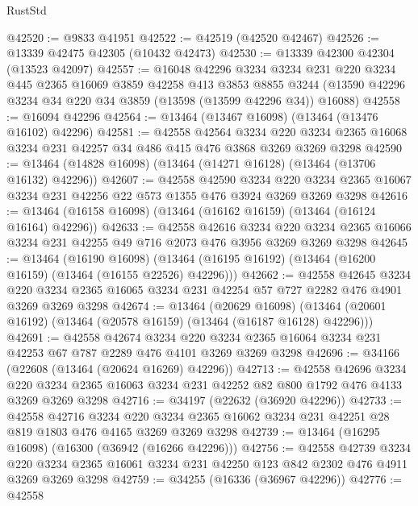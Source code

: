 \begin{lexlean}{RustStd}
\begin{coremodule}
@42520 := @9833 @41951
@42522 := @42519 (@42520 @42467)
@42526 := @13339 @42475 @42305 (@10432 @42473)
@42530 := @13339 @42300 @42304 (@13523 @42097)
@42557 := @16048
    @42296
    @3234
    @3234
    @231
    @220
    @3234
    @445
    @2365
    @16069
    @3859
    @42258
    @413
    @3853
    @8855
    @3244
    (@13590 @42296 @3234 @34 @220 @34 @3859 (@13598 (@13599 @42296 @34)) @16088)
@42558 := @16094 @42296
@42564 := @13464 (@13467 @16098) (@13464 (@13476 @16102) @42296)
@42581 := @42558
    @42564
    @3234
    @220
    @3234
    @2365
    @16068
    @3234
    @231
    @42257
    @34
    @486
    @415
    @476
    @3868
    @3269
    @3269
    @3298
@42590 := @13464 (@14828 @16098) (@13464 (@14271 @16128) (@13464 (@13706 @16132) @42296))
@42607 := @42558
    @42590
    @3234
    @220
    @3234
    @2365
    @16067
    @3234
    @231
    @42256
    @22
    @573
    @1355
    @476
    @3924
    @3269
    @3269
    @3298
@42616 := @13464 (@16158 @16098) (@13464 (@16162 @16159) (@13464 (@16124 @16164) @42296))
@42633 := @42558
    @42616
    @3234
    @220
    @3234
    @2365
    @16066
    @3234
    @231
    @42255
    @49
    @716
    @2073
    @476
    @3956
    @3269
    @3269
    @3298
@42645 := @13464
    (@16190 @16098)
    (@13464 (@16195 @16192) (@13464 (@16200 @16159) (@13464 (@16155 @22526) @42296)))
@42662 := @42558
    @42645
    @3234
    @220
    @3234
    @2365
    @16065
    @3234
    @231
    @42254
    @57
    @727
    @2282
    @476
    @4901
    @3269
    @3269
    @3298
@42674 := @13464
    (@20629 @16098)
    (@13464 (@20601 @16192) (@13464 (@20578 @16159) (@13464 (@16187 @16128) @42296)))
@42691 := @42558
    @42674
    @3234
    @220
    @3234
    @2365
    @16064
    @3234
    @231
    @42253
    @67
    @787
    @2289
    @476
    @4101
    @3269
    @3269
    @3298
@42696 := @34166 (@22608 (@13464 (@20624 @16269) @42296))
@42713 := @42558
    @42696
    @3234
    @220
    @3234
    @2365
    @16063
    @3234
    @231
    @42252
    @82
    @800
    @1792
    @476
    @4133
    @3269
    @3269
    @3298
@42716 := @34197 (@22632 (@36920 @42296))
@42733 := @42558
    @42716
    @3234
    @220
    @3234
    @2365
    @16062
    @3234
    @231
    @42251
    @28
    @819
    @1803
    @476
    @4165
    @3269
    @3269
    @3298
@42739 := @13464 (@16295 @16098) (@16300 (@36942 (@16266 @42296)))
@42756 := @42558
    @42739
    @3234
    @220
    @3234
    @2365
    @16061
    @3234
    @231
    @42250
    @123
    @842
    @2302
    @476
    @4911
    @3269
    @3269
    @3298
@42759 := @34255 (@16336 (@36967 @42296))
@42776 := @42558

\end{coremodule}
\end{lexlean}
